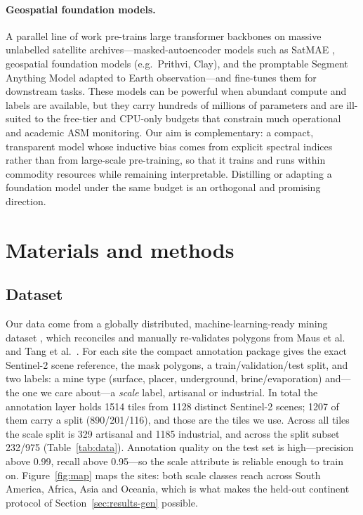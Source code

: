 \documentclass[review]{elsarticle}
\begin{document}
\paragraph{Geospatial foundation models.}
A parallel line of work pre-trains large transformer backbones on massive unlabelled
satellite archives---masked-autoencoder models such as SatMAE \citep{cong2022satmae},
geospatial foundation models (e.g.\ Prithvi, Clay), and the promptable Segment Anything Model
\citep{kirillov2023sam} adapted to Earth observation---and fine-tunes them for downstream
tasks. These models can be
powerful when abundant compute and labels are available, but they carry hundreds of millions
of parameters and are ill-suited to the free-tier and CPU-only budgets that constrain much
operational and academic ASM monitoring. Our aim is complementary: a compact, transparent
model whose inductive bias comes from explicit spectral indices rather than from large-scale
pre-training, so that it trains and runs within commodity resources while remaining
interpretable. Distilling or adapting a foundation model under the same budget is an
orthogonal and promising direction.

\section{Materials and methods}\label{sec:methods}

\subsection{Dataset}\label{sec:data}
Our data come from a globally distributed, machine-learning-ready mining dataset
\citep{jasansky2024dataset}, which reconciles and manually re-validates polygons from Maus
et al.\ \cite{maus2022global} and Tang et al.\ \cite{tang2023mining}. For each site the
compact annotation package gives the exact Sentinel-2 scene reference, the mask polygons, a
train/validation/test split, and two labels: a mine type (surface, placer, underground,
brine/evaporation) and---the one we care about---a \emph{scale} label, artisanal or
industrial. In total the annotation layer holds \num{1514} tiles from \num{1128} distinct
Sentinel-2 scenes; \num{1207} of them carry a split (\num{890}/\num{201}/\num{116}), and
those are the tiles we use. Across all tiles the scale split is \num{329} artisanal and
\num{1185} industrial, and across the split subset \num{232}/\num{975} (Table~\ref{tab:data}).
Annotation quality on the test set is high---precision above \num{0.99}, recall above
\num{0.95}---so the scale attribute is reliable enough to train on. Figure~\ref{fig:map}
maps the sites: both scale classes reach across South America, Africa, Asia and Oceania,
which is what makes the held-out continent protocol of Section~\ref{sec:results-gen}
possible.
\end{document}
